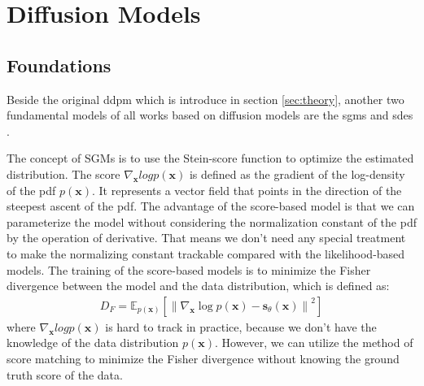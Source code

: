 \documentclass[12pt,DIV14,BCOR12mm,a4paper,footinclude=false,headinclude,parskip=half-,twoside,openright,cleardoublepage=empty,toc=index,bibliography=totoc,listof=totoc]{scrreprt}
\numberwithin{equation}{chapter}
\begin{document}
\section{Diffusion Models}
\subsection{Foundations}
Beside the original \gls{ddpm} \cite{sohldickstein2015deep,ho2020denoising} which is introduce in section \ref{sec:theory}, another two fundamental models of all works based on diffusion models are the \glspl{sgm} \cite{song2020generative,song2020improved} and \glspl{sde} \cite{song2021maximum,song2021scorebased}.

The concept of SGMs is to use the Stein-score function to optimize the estimated distribution. The score $\nabla_{\mathbf{x}}log p(\mathbf{x})$ is defined as the gradient of the log-density of the \gls{pdf} $p(\mathbf{x})$. It represents a vector field that points in the direction of the steepest ascent of the \gls{pdf}. The advantage of the score-based model is that we can parameterize the model without considering the normalization constant of the \gls{pdf} by the operation of derivative. That means we don't need any special treatment to make the normalizing constant trackable compared with the likelihood-based models. The training of the score-based models is to minimize the Fisher divergence between the model and the data distribution, which is defined as:
\begin{align}\label{eq:sgm}
  D_{F} = \mathbb{E}_{p(\mathbf{x})}\left[\left\lVert\nabla_{\mathbf{x}}\log p(\mathbf{x}) - \mathbf{s}_{\theta}(\mathbf{x})\right\rVert^{2}\right]
\end{align}
where $\nabla_{\mathbf{x}}log p(\mathbf{x})$ is hard to track in practice, because we don't have the knowledge of the data distribution $p(\mathbf{x})$. However, we can utilize the method of score matching \cite{10.5555/1046920.1088696,6795935} to minimize the Fisher divergence without knowing the ground truth score of the data.
\end{document}
